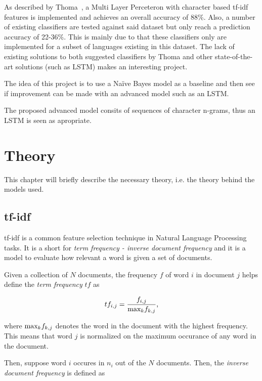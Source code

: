 \documentclass[conference]{IEEEtran}
\begin{document}
As described by Thoma~\cite{wili}, a Multi Layer Perceteron with character based tf-idf features is implemented and achieves an overall accuracy of 88\%. Also, a number of existing classifiers are tested against said dataset but only reach a prediction accuracy of 22-36\%. This is mainly due to that these classifiers only are implemented for a subset of languages existing in this dataset. The lack of existing solutions to both suggested classifiers by Thoma and other state-of-the-art solutions (such as LSTM) makes an interesting project. 

The idea of this project is to use a Naïve Bayes model as a baseline and then see if improvement can be made with an advanced model such as an LSTM.

The proposed advanced model consits of sequences of character n-grams, thus an LSTM is seen as apropriate.


 

\section{Theory}
This chapter will briefly describe the necessary theory, i.e. the theory behind the models used.

\subsection{tf-idf}
tf-idf is a common feature selection technique in Natural Language Processing tasks. It is a short for \textit{term frequency - inverse document frequency} and it is a model to evaluate how relevant a word is given a set of documents.

Given a collection of $N$ documents, the frequency $f$ of word $i$ in document $j$ helps define the \textit{term frequency} $tf$ as

$$tf_{i,j}= \frac{f_{i,j}}{\textnormal{max}_k f_{k,j}} \textnormal{,}$$

where $\textnormal{max}_kf_{k,j}$ denotes the word in the document with the highest frequency. This means that word $j$ is normalized on the maximum occurance of any word in the document.

Then, suppose word $i$ occures in $n_i$ out of the $N$ documents. Then, the \textit{inverse document frequency} is defined as
\end{document}
